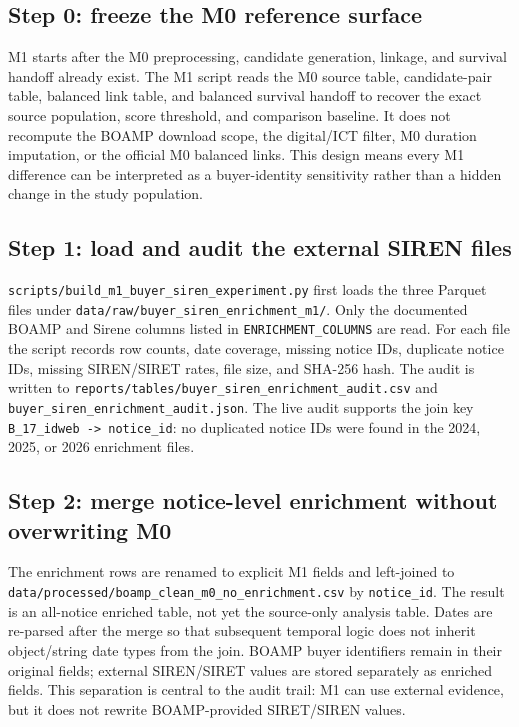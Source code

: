 \documentclass[11pt]{article}
\begin{document}
\subsection{Step 0: freeze the M0 reference surface}

M1 starts after the M0 preprocessing, candidate generation, linkage, and
survival handoff already exist. The M1 script reads the M0 source table,
candidate-pair table, balanced link table, and balanced survival handoff to
recover the exact source population, score threshold, and comparison
baseline. It does not recompute the BOAMP download scope, the digital/ICT
filter, M0 duration imputation, or the official M0 balanced links. This
design means every M1 difference can be interpreted as a buyer-identity
sensitivity rather than a hidden change in the study population.

\subsection{Step 1: load and audit the external SIREN files}

\texttt{scripts/build\_m1\_buyer\_siren\_experiment.py} first loads the
three Parquet files under
\texttt{data/raw/buyer\_siren\_enrichment\_m1/}. Only the documented
BOAMP and Sirene columns listed in \texttt{ENRICHMENT\_COLUMNS} are read.
For each file the script records row counts, date coverage, missing notice
IDs, duplicate notice IDs, missing SIREN/SIRET rates, file size, and SHA-256
hash. The audit is written to
\texttt{reports/tables/buyer\_siren\_enrichment\_audit.csv} and
\texttt{buyer\_siren\_enrichment\_audit.json}. The live audit supports the
join key \texttt{B\_17\_idweb -> notice\_id}: no duplicated notice IDs were
found in the 2024, 2025, or 2026 enrichment files.

\subsection{Step 2: merge notice-level enrichment without overwriting M0}

The enrichment rows are renamed to explicit M1 fields and left-joined to
\texttt{data/processed/boamp\_clean\_m0\_no\_enrichment.csv} by
\texttt{notice\_id}. The result is an all-notice enriched table, not yet the
source-only analysis table. Dates are re-parsed after the merge so that
subsequent temporal logic does not inherit object/string date types from the
join. BOAMP buyer identifiers remain in their original fields; external
SIREN/SIRET values are stored separately as enriched fields. This separation
is central to the audit trail: M1 can use external evidence, but it does not
rewrite BOAMP-provided SIRET/SIREN values.
\end{document}
